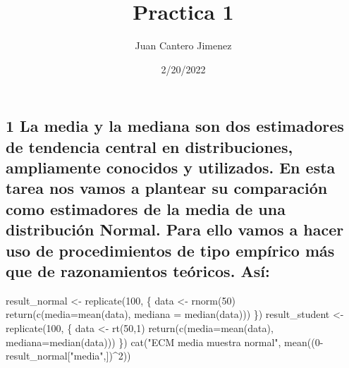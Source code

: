 \documentclass[
]{article}
\title{Practica 1}
\author{Juan Cantero Jimenez}
\date{2/20/2022}
\newenvironment{Shaded}{\begin{snugshade}}{\end{snugshade}}
\newcommand{\AttributeTok}[1]{\textcolor[rgb]{0.77,0.63,0.00}{#1}}
\newcommand{\DecValTok}[1]{\textcolor[rgb]{0.00,0.00,0.81}{#1}}
\newcommand{\FunctionTok}[1]{\textcolor[rgb]{0.00,0.00,0.00}{#1}}
\newcommand{\NormalTok}[1]{#1}
\newcommand{\OtherTok}[1]{\textcolor[rgb]{0.56,0.35,0.01}{#1}}
\newcommand{\SpecialCharTok}[1]{\textcolor[rgb]{0.00,0.00,0.00}{#1}}
\newcommand{\StringTok}[1]{\textcolor[rgb]{0.31,0.60,0.02}{#1}}
\begin{document}
\maketitle

\hypertarget{la-media-y-la-mediana-son-dos-estimadores-de-tendencia-central-en-distribuciones-ampliamente-conocidos-y-utilizados.-en-esta-tarea-nos-vamos-a-plantear-su-comparaciuxf3n-como-estimadores-de-la-media-de-una-distribuciuxf3n-normal.-para-ello-vamos-a-hacer-uso-de-procedimientos-de-tipo-empuxedrico-muxe1s-que-de-razonamientos-teuxf3ricos.-asuxed}{%
\subsection{1 La media y la mediana son dos estimadores de tendencia
central en distribuciones, ampliamente conocidos y utilizados. En esta
tarea nos vamos a plantear su comparación como estimadores de la media
de una distribución Normal. Para ello vamos a hacer uso de
procedimientos de tipo empírico más que de razonamientos teóricos.
Así:}\label{la-media-y-la-mediana-son-dos-estimadores-de-tendencia-central-en-distribuciones-ampliamente-conocidos-y-utilizados.-en-esta-tarea-nos-vamos-a-plantear-su-comparaciuxf3n-como-estimadores-de-la-media-de-una-distribuciuxf3n-normal.-para-ello-vamos-a-hacer-uso-de-procedimientos-de-tipo-empuxedrico-muxe1s-que-de-razonamientos-teuxf3ricos.-asuxed}}

\begin{Shaded}
\begin{Highlighting}[]
\NormalTok{result\_normal }\OtherTok{\textless{}{-}} \FunctionTok{replicate}\NormalTok{(}\DecValTok{100}\NormalTok{, \{}
\NormalTok{  data }\OtherTok{\textless{}{-}} \FunctionTok{rnorm}\NormalTok{(}\DecValTok{50}\NormalTok{)}
  \FunctionTok{return}\NormalTok{(}\FunctionTok{c}\NormalTok{(}\AttributeTok{media=}\FunctionTok{mean}\NormalTok{(data), }\AttributeTok{mediana =} \FunctionTok{median}\NormalTok{(data)))}
\NormalTok{\})}
\NormalTok{result\_student }\OtherTok{\textless{}{-}} \FunctionTok{replicate}\NormalTok{(}\DecValTok{100}\NormalTok{, \{}
\NormalTok{  data }\OtherTok{\textless{}{-}} \FunctionTok{rt}\NormalTok{(}\DecValTok{50}\NormalTok{,}\DecValTok{1}\NormalTok{)}
  \FunctionTok{return}\NormalTok{(}\FunctionTok{c}\NormalTok{(}\AttributeTok{media=}\FunctionTok{mean}\NormalTok{(data), }\AttributeTok{mediana=}\FunctionTok{median}\NormalTok{(data)))}
\NormalTok{\})}
\FunctionTok{cat}\NormalTok{(}\StringTok{"ECM media muestra normal"}\NormalTok{, }\FunctionTok{mean}\NormalTok{((}\DecValTok{0}\SpecialCharTok{{-}}\NormalTok{result\_normal[}\StringTok{"media"}\NormalTok{,])}\SpecialCharTok{\^{}}\DecValTok{2}\NormalTok{))}
\end{Highlighting}
\end{Shaded}
\end{document}
